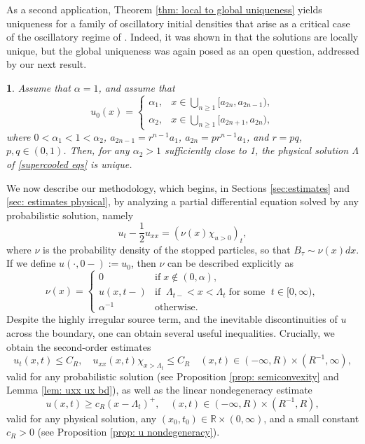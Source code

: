 \documentclass{article}
\numberwithin{equation}{section}
\numberwithin{figure}{section}
\theoremstyle{plain}
\theoremstyle{plain}
\theoremstyle{plain}
\newtheorem{cor}[thm]{\protect\corollaryname}
\theoremstyle{plain}
\theoremstyle{definition}
\theoremstyle{remark}
\def\R{{\mathbb{R}}}
\providecommand{\corollaryname}{Corollary}
\begin{document}
As a second application, Theorem \ref{thm: local to global uniqueness} yields uniqueness for a family of oscillatory initial densities that arise as a critical case of the oscillatory regime of \cite[Thm. 1.1]{shkolnikov}. Indeed, it was shown in \cite[Prop. 1.6]{shkolnikov} that the solutions are locally unique, but the global uniqueness was again posed as an open question, addressed by our next result.
\begin{cor}Assume that $\alpha=1$, and assume that
\begin{equation}
u_0(x)=
\begin{cases}
\alpha_1,& x\in\bigcup_{n\ge 1}[a_{2n},a_{2n-1}),\\
\alpha_2,& x\in\bigcup_{n\ge 1}[a_{2n+1},a_{2n}),
\end{cases}
\end{equation}
where $0<\alpha_1<1<\alpha_2$, $a_{2n-1}=r^{n-1}a_1$, $a_{2n}=pr^{n-1}a_1$, and $r=pq$, $p,q\in(0,1)$. Then, for any $\alpha_2>1$ sufficiently close to 1, the physical solution $\Lambda$ of \eqref{supercooled eqs} is unique.  
\end{cor}
We now describe our methodology, which begins, in Sections \ref{sec:estimates} and \ref{sec: estimates physical}, by analyzing a partial differential equation solved by any probabilistic solution, namely
\begin{equation}\label{u eq intro} u_t-\frac12 u_{xx}=(\nu(x)\chi_{u>0})_t,\end{equation}
where $\nu$ is the probability density of the stopped particles, so that $B_{\tau} \sim \nu(x)dx.$ If we define $u(\cdot,0-):=u_0$, then $\nu$ can be described explicitly as
\begin{equation} \label{nu defi}
    \nu(x)=\begin{cases} 0 &\text{if} \;x\notin(0,\alpha),\\ 
    u(x,t-) & \text{if} \;\;\Lambda_{t-}<x<\Lambda_t \; \text{for some }\; t\in [0,\infty),\\
    \alpha^{-1} & \text{otherwise.}      
    \end{cases}
\end{equation}
Despite the highly irregular source term, and the inevitable discontinuities of $u$ across the boundary, one can obtain several useful inequalities. Crucially, we obtain the second-order estimates
\begin{equation} \label{2 order intro}
u_t(x,t)\leq C_R, \quad u_{xx}(x,t)\chi_{x>\Lambda_t} \leq C_R \quad  (x,t)\in (-\infty,R) \times (R^{-1},\infty),  
\end{equation}
valid for any probabilistic solution (see Proposition \ref{prop: semiconvexity} and Lemma \ref{lem: uxx ux bd}), as well as the linear nondegeneracy estimate
\begin{equation} \label{nondegeneracy intro}
u(x,t)\geq c_R (x-\Lambda_t)^+, \quad (x,t)\in (-\infty,R) \times (R^{-1},R), 
\end{equation}
valid for any physical solution, any $(x_0,t_0)\in \R \times (0,\infty)$, and a small constant $c_R>0$ (see Proposition \ref{prop: u nondegeneracy}). 
\end{document}
